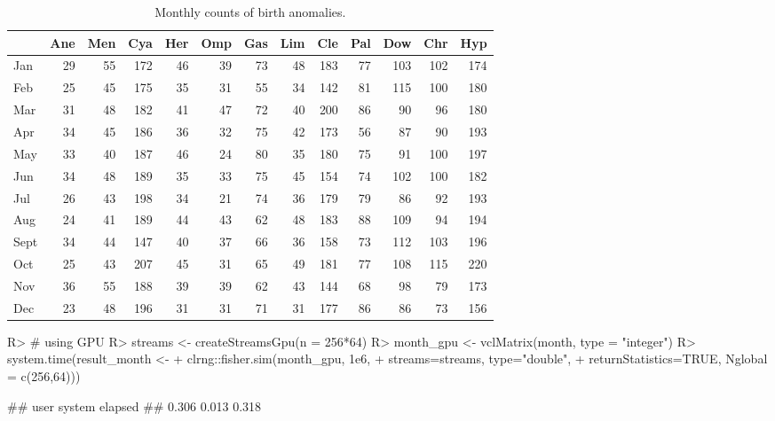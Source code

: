 \documentclass[article,nojss]{jss}\usepackage[]{graphicx}\usepackage[]{color}
\begin{document}
\begin{table}

\caption{\label{tab:monthdata}Monthly counts of birth anomalies.\label{tab:month}}
\centering
\begin{tabular}[t]{lrrrrrrrrrrrr}
\toprule
  & Ane & Men & Cya & Her & Omp & Gas & Lim & Cle & Pal & Dow & Chr & Hyp\\
\midrule
Jan & 29 & 55 & 172 & 46 & 39 & 73 & 48 & 183 & 77 & 103 & 102 & 174\\
Feb & 25 & 45 & 175 & 35 & 31 & 55 & 34 & 142 & 81 & 115 & 100 & 180\\
Mar & 31 & 48 & 182 & 41 & 47 & 72 & 40 & 200 & 86 & 90 & 96 & 180\\
Apr & 34 & 45 & 186 & 36 & 32 & 75 & 42 & 173 & 56 & 87 & 90 & 193\\
May & 33 & 40 & 187 & 46 & 24 & 80 & 35 & 180 & 75 & 91 & 100 & 197\\
Jun & 34 & 48 & 189 & 35 & 33 & 75 & 45 & 154 & 74 & 102 & 100 & 182\\
Jul & 26 & 43 & 198 & 34 & 21 & 74 & 36 & 179 & 79 & 86 & 92 & 193\\
Aug & 24 & 41 & 189 & 44 & 43 & 62 & 48 & 183 & 88 & 109 & 94 & 194\\
Sept & 34 & 44 & 147 & 40 & 37 & 66 & 36 & 158 & 73 & 112 & 103 & 196\\
Oct & 25 & 43 & 207 & 45 & 31 & 65 & 49 & 181 & 77 & 108 & 115 & 220\\
Nov & 36 & 55 & 188 & 39 & 39 & 62 & 43 & 144 & 68 & 98 & 79 & 173\\
Dec & 23 & 48 & 196 & 31 & 31 & 71 & 31 & 177 & 86 & 86 & 73 & 156\\
\bottomrule
\end{tabular}
\end{table}





\begin{CodeChunk}
\begin{CodeInput}
R> # using GPU
R> streams <- createStreamsGpu(n = 256*64)
R> month_gpu <- vclMatrix(month, type = "integer")
R> system.time(result_month <- 
+  clrng::fisher.sim(month_gpu, 1e6, 
+     streams=streams, type="double", 
+     returnStatistics=TRUE,  Nglobal = c(256,64)))
\end{CodeInput}
\begin{CodeOutput}
##    user  system elapsed 
##   0.306   0.013   0.318
\end{CodeOutput} 
\end{CodeChunk} 
\end{document}

